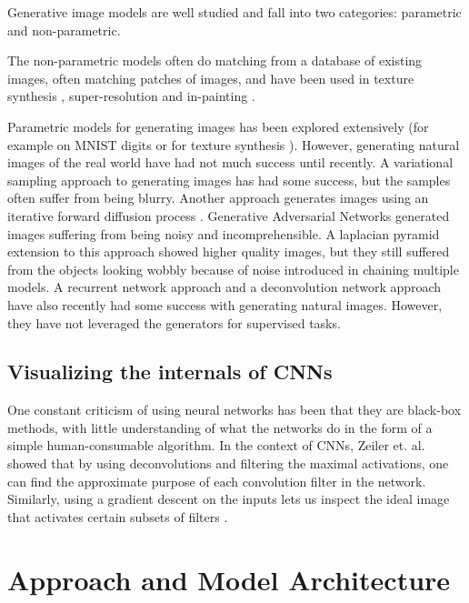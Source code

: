 \documentclass{article} %
\begin{document}
Generative image models are well studied and fall into two categories: parametric and non-parametric.

The non-parametric models often do matching from a database of existing images, often matching patches of images, and have been used in texture synthesis \citep{efros1999texture}, super-resolution \citep{freeman2002example} and in-painting \citep{hays2007scene}.

Parametric models for generating images has been explored extensively (for example on MNIST digits or for texture synthesis \citep{portilla2000parametric}). 
However, generating natural images of the real world have had not much success until recently. A variational sampling approach to generating images \citep{kingma2013auto} has had some success, but the samples often suffer from being blurry. Another approach generates images using an iterative forward diffusion process \citep{sohl2015deep}. Generative Adversarial Networks \citep{Goodfellow2014} generated images suffering from being noisy and incomprehensible. A laplacian pyramid extension to this approach \citep{denton2015deep} showed higher quality images, but they still suffered from the objects looking wobbly because of noise introduced in chaining multiple models. A recurrent network approach \citep{gregor2015draw} and a deconvolution network approach \citep{dosovitskiy2014learning} have also recently had some success with generating natural images. However, they have not leveraged the generators for supervised tasks.

\subsection{Visualizing the internals of CNNs}

One constant criticism of using neural networks has been that they are black-box methods, with little understanding of what the networks do in the form of a simple human-consumable algorithm. In the context of CNNs, Zeiler et. al. \citep{zeiler2014visualizing} showed that by using deconvolutions and filtering the maximal activations, one can find the approximate purpose of each convolution filter in the network. Similarly, using a gradient descent on the inputs lets us inspect the ideal image that activates certain subsets of filters \citep{Inceptionism2015}. 

\section{Approach and Model Architecture}
\end{document}
